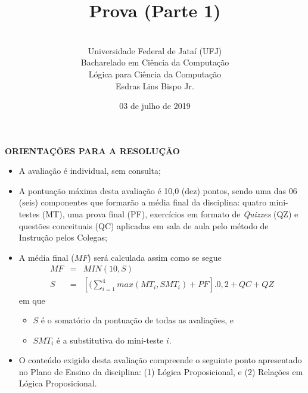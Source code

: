 \documentclass[12pt,a4paper,oneside]{article}
\author{\\Universidade Federal de Jataí (UFJ)\\Bacharelado em Ciência da Computação \\Lógica para Ciência da Computação \\Esdras Lins Bispo Jr.}
\date{03 de julho de 2019}
\title{\sc \huge Prova (Parte 1)}
\begin{document}
\maketitle

{\bf ORIENTAÇÕES PARA A RESOLUÇÃO}

\small
 
\begin{itemize}
	\item A avaliação é individual, sem consulta;
	\item A pontuação máxima desta avaliação é 10,0 (dez) pontos, sendo uma das 06 (seis) componentes que formarão a média final da disciplina: quatro mini-testes (MT), uma prova final (PF), exercícios em formato de {\it Quizzes} (QZ) e questões conceituais (QC) aplicadas em sala de aula pelo método de Instrução pelos Colegas;
	\item A média final ($MF$) será calculada assim como se segue
	\begin{eqnarray}
		MF & = & MIN(10, S) \nonumber \\
		S & = & [(\sum_{i=1}^{4} max(MT_i, SMT_i ) + PF].0,2  + QC + QZ\nonumber
	\end{eqnarray}
	em que 
	\begin{itemize}
		\item $S$ é o somatório da pontuação de todas as avaliações, e
		\item $SMT_i$ é a substitutiva do mini-teste $i$.
	\end{itemize}
	\item O conteúdo exigido desta avaliação compreende o seguinte ponto apresentado no Plano de Ensino da disciplina: (1) Lógica Proposicional, e (2) Relações em Lógica Proposicional.
\end{itemize}

\begin{center}
\end{center}

\newpage
\end{document}
